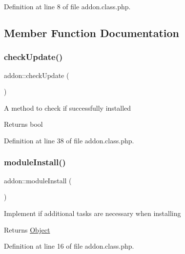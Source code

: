 Definition at line 8 of file addon.\+class.\+php.



\subsection{Member Function Documentation}
\hypertarget{classaddon_a88804ecbcb4993b0ad3fe2ac9763f17b}{}\label{classaddon_a88804ecbcb4993b0ad3fe2ac9763f17b} 
\subsubsection{\texorpdfstring{check\+Update()}{checkUpdate()}}
{\footnotesize\ttfamily addon\+::check\+Update (\begin{DoxyParamCaption}{ }\end{DoxyParamCaption})}

A method to check if successfully installed

\begin{DoxyReturn}{Returns}
bool 
\end{DoxyReturn}


Definition at line 38 of file addon.\+class.\+php.

\hypertarget{classaddon_a7ac2ab52a9e9cdc5c890b38a958b74ab}{}\label{classaddon_a7ac2ab52a9e9cdc5c890b38a958b74ab} 
\subsubsection{\texorpdfstring{module\+Install()}{moduleInstall()}}
{\footnotesize\ttfamily addon\+::module\+Install (\begin{DoxyParamCaption}{ }\end{DoxyParamCaption})}

Implement if additional tasks are necessary when installing

\begin{DoxyReturn}{Returns}
\hyperlink{classObject}{Object} 
\end{DoxyReturn}


Definition at line 16 of file addon.\+class.\+php.

\hypertarget{classaddon_af26212943701043993c73a5e81e93ca1}{}\label{classaddon_af26212943701043993c73a5e81e93ca1} 
